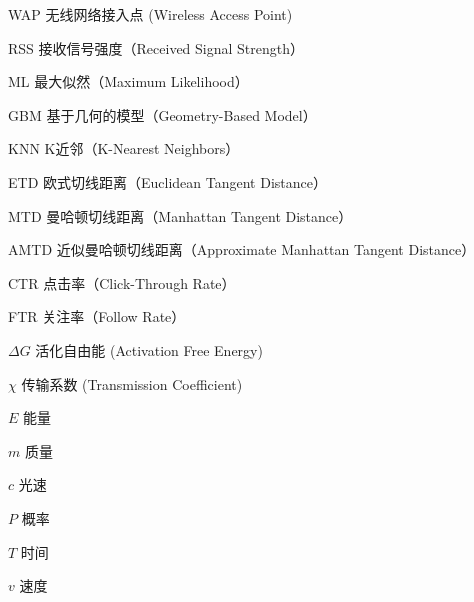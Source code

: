 \begin{denotation}[3cm]
\item[WAP] 无线网络接入点 (Wireless Access Point)
\item[RSS] 接收信号强度（Received Signal Strength）
\item[ML] 最大似然（Maximum Likelihood）
\item[GBM] 基于几何的模型（Geometry-Based Model）
\item[KNN] K近邻（K-Nearest Neighbors）
\item[ETD] 欧式切线距离（Euclidean Tangent Distance）
\item[MTD] 曼哈顿切线距离（Manhattan Tangent Distance）
\item[AMTD] 近似曼哈顿切线距离（Approximate Manhattan Tangent Distance）
\item[CTR] 点击率（Click-Through Rate）
\item[FTR] 关注率（Follow Rate）

\item[$\Delta G$] 活化自由能 (Activation Free Energy)
\item[$\chi$] 传输系数 (Transmission Coefficient)
\item[$E$] 能量
\item[$m$] 质量
\item[$c$] 光速
\item[$P$] 概率
\item[$T$] 时间
\item[$v$] 速度

\end{denotation}
